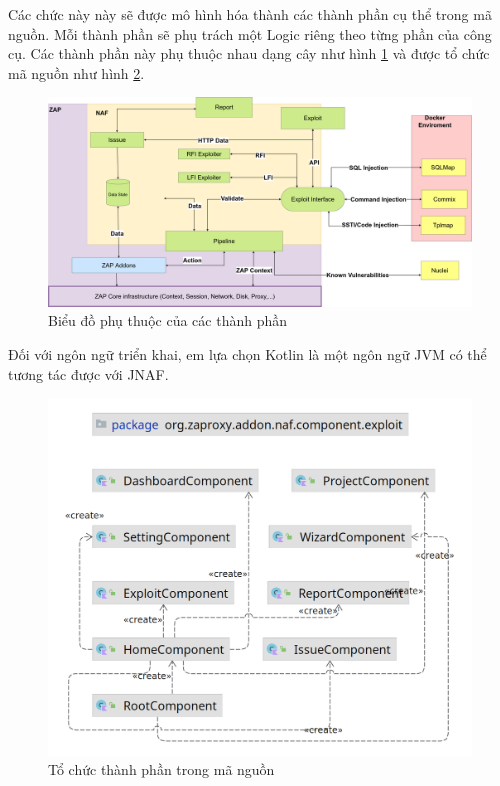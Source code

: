 \documentclass[./../main.tex]{subfiles}
\begin{document}
Các chức này này sẽ được mô hình hóa thành các thành phần cụ thể trong mã nguồn. Mỗi thành phần sẽ phụ trách một Logic riêng theo từng phần của công cụ. Các thành phần
này phụ thuộc nhau dạng cây như hình \ref{fig:component} và được tổ chức
mã nguồn như hình \ref{fig:package}.

\begin{figure}[ht!]
	\includegraphics[width=\linewidth]{./images/component.png}
	\caption{Biểu đồ phụ thuộc của các thành phần}
	\label{fig:component}
\end{figure}

Đối với ngôn ngữ triển khai, em lựa chọn Kotlin là một ngôn ngữ JVM
có thể tương tác được với JNAF.

\begin{figure}[ht!]
	\includegraphics[width=\linewidth]{./images/package.png}
	\caption{Tổ chức thành phần trong mã nguồn}
	\label{fig:package}
\end{figure}
\end{document}
